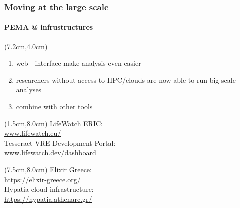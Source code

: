 \documentclass{beamer}
\begin{document}
   \begin{frame}
      \frametitle{Moving at the large scale}
      \framesubtitle{PEMA @ infrustructures}
      \begin{singlespace}

         \begin{textblock*}{5cm}(7.2cm,4.0cm)
            \begin{enumerate}
               \item \small web - interface make analysis even easier
               \item \small researchers without access to HPC/clouds are now able to run big scale analyses
               \item \small combine with other tools
            \end{enumerate}
         \end{textblock*}

         \begin{textblock*}{5cm}(1.5cm,8.0cm)
            \tiny LifeWatch ERIC: \\ \href{https://www.lifewatch.eu/}{www.lifewatch.eu/} \\
            \tiny Tesseract VRE Development Portal: \\ \href{https://www.lifewatch.dev/dashboard}{www.lifewatch.dev/dashboard}
   
         \end{textblock*}

         \begin{textblock*}{5cm}(7.5cm,8.0cm)
            \tiny Elixir Greece: \\ \href{https://elixir-greece.org/}{https://elixir-greece.org/} \\
            \tiny Hypatia cloud infrastructure: \\ \href{https://hypatia.athenarc.gr/}{https://hypatia.athenarc.gr/}
   

\end{textblock*}
\end{singlespace}
\end{frame}
\end{document}
